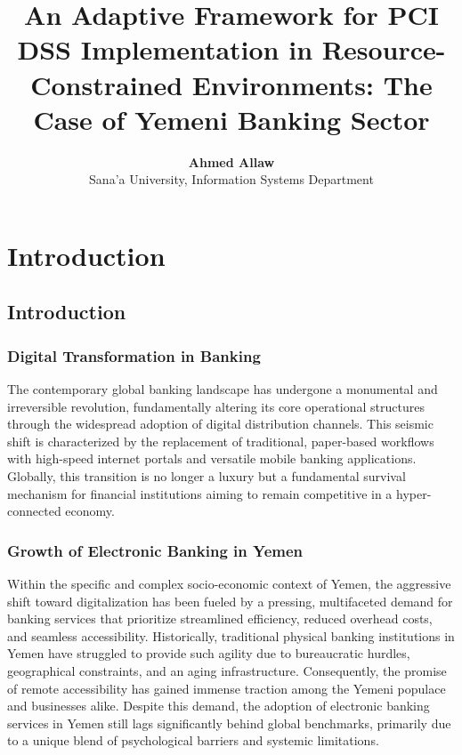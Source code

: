 \documentclass[12pt,a4paper,oneside]{report}
\title{\textbf{An Adaptive Framework for PCI DSS Implementation in Resource-Constrained Environments: The Case of Yemeni Banking Sector}}
\author{\textbf{Ahmed Allaw} \\ 
	Sana'a University, Information Systems Department}
\date{}
\begin{document}
	
	\maketitle
	
	\tableofcontents
	\newpage
	
	\chapter{Introduction}
	
	\section{Introduction}
	
	\subsection{Digital Transformation in Banking}
	The contemporary global banking landscape has undergone a monumental and irreversible revolution, fundamentally altering its core operational structures through the widespread adoption of digital distribution channels. This seismic shift is characterized by the replacement of traditional, paper-based workflows with high-speed internet portals and versatile mobile banking applications. Globally, this transition is no longer a luxury but a fundamental survival mechanism for financial institutions aiming to remain competitive in a hyper-connected economy.
	
	\subsection{Growth of Electronic Banking in Yemen}
	Within the specific and complex socio-economic context of Yemen, the aggressive shift toward digitalization has been fueled by a pressing, multifaceted demand for banking services that prioritize streamlined efficiency, reduced overhead costs, and seamless accessibility. Historically, traditional physical banking institutions in Yemen have struggled to provide such agility due to bureaucratic hurdles, geographical constraints, and an aging infrastructure. Consequently, the promise of remote accessibility has gained immense traction among the Yemeni populace and businesses alike. Despite this demand, the adoption of electronic banking services in Yemen still lags significantly behind global benchmarks, primarily due to a unique blend of psychological barriers and systemic limitations.
	
\end{document}
